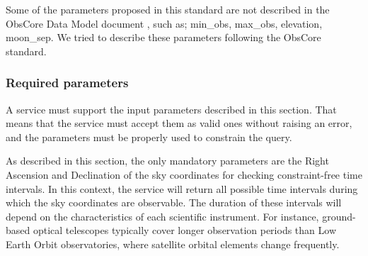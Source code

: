 \documentclass[11pt,a4paper]{ivoatex/ivoa}
\begin{document}
Some of the parameters proposed in this standard are not described in
the ObsCore Data Model document , such as; min\_obs, max\_obs,
elevation, moon\_sep. We tried to describe these parameters following
the ObsCore standard.

\subsubsection{Required parameters}
A service must support the input parameters described in this section.
That means that the service must accept them as valid ones without
raising an error, and the parameters must be properly used to constrain
the query.

As described in this section, the only mandatory parameters are the Right 
Ascension and Declination of the sky coordinates for checking constraint-free 
time intervals. In this context, the service will return all possible time 
intervals during which the sky coordinates are observable. The duration of 
these intervals will depend on the characteristics of each scientific 
instrument. For instance, ground-based optical telescopes typically cover 
longer observation periods than Low Earth Orbit observatories, where 
satellite orbital elements change frequently.
\end{document}
